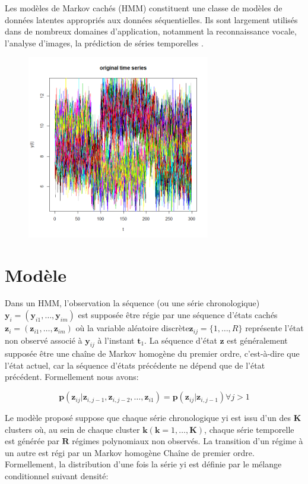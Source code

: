 \documentclass[11pt]{article}
\newcommand{\bsy}{\boldsymbol{y}}
\newcommand{\bsp}{\boldsymbol{p}}
\newcommand{\bsz}{\boldsymbol{z}}
\newcommand{\bsk}{\boldsymbol{k}}
\newcommand{\bst}{\boldsymbol{t}}
\newcommand{\bK}{\mathbf{K}}
\newcommand{\bR}{\mathbf{R}}
\begin{document}
Les modèles de Markov cachés (HMM) constituent une classe de modèles de données latentes appropriés aux données séquentielles. Ils sont largement utilisés dans de nombreux domaines d’application, notamment la reconnaissance vocale, l’analyse d’images, la prédiction de séries temporelles .\\


\begin{figure}[h]
\begin{center}
\includegraphics[height=8cm]{data1.png}
\end{center}
\end{figure}

\newpage
\tableofcontents
\newpage
\section*{Modèle}

Dans un HMM, l’observation la séquence (ou une série chronologique) $\bsy_{i} = (\bsy_{i1},\ldots, \bsy_{im})$ est supposée être régie par une séquence d'états cachés$\bsz_{i} = (\bsz_{i1},\ldots, \bsz_{im})$ où la variable aléatoire discrète$\bsz_{ij}=\{1, \dots , R\}$ représente l'état non observé associé à  $\bsy_{ij}$ à l'instant $\bst_{1}$. La séquence d'état $\bsz$ est généralement supposée être une chaîne de Markov homogène du premier ordre, c'est-à-dire que l'état actuel, car la séquence d'états précédente ne dépend que de l'état précédent. Formellement nous avons:

\begin{equation}
\bsp(\bsz_{ij} | \bsz_{i,j-1},  \bsz_{i,j-2}, \dots, \bsz_{i1}) = \bsp(\bsz_{ij} | \bsz_{i,j-1}) \forall j > 1
\end{equation}

Le modèle proposé suppose que chaque série chronologique yi est issu d’un des $\bK$ clusters où, au sein de chaque cluster $\bsk (\bsk = 1,\dots, \bK)$, chaque série temporelle est générée par $\bR$ régimes polynomiaux non observés. La transition d'un régime à un autre est régi par un Markov homogène Chaîne de premier ordre. Formellement, la distribution d'une fois la série yi est définie par le mélange conditionnel suivant densité: 
\end{document}
